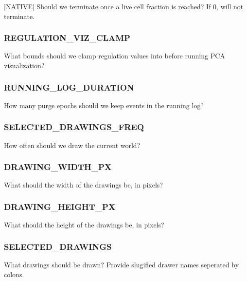 
[NATIVE] Should we terminate once a live cell fraction is reached? If 0, will not terminate.

\subsubsection{REGULATION\_VIZ\_CLAMP}


What bounds should we clamp regulation values into before running PCA visualization?

\subsubsection{RUNNING\_LOG\_DURATION}


How many purge epochs should we keep events in the running log?

\subsubsection{SELECTED\_DRAWINGS\_FREQ}


How often should we draw the current world?

\subsubsection{DRAWING\_WIDTH\_PX}


What should the width of the drawings be, in pixels?

\subsubsection{DRAWING\_HEIGHT\_PX}


What should the height of the drawings be, in pixels?

\subsubsection{SELECTED\_DRAWINGS}


What drawings should be drawn? Provide slugified drawer names seperated by colons.

